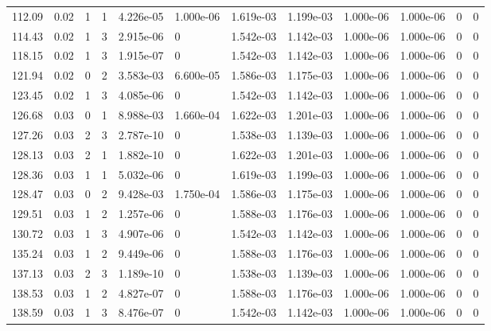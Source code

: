 \documentclass[preview]{standalone}
\begin{document}
{{{\begin{tabular}{L{1.2cm}C{1.2cm} C{0.3cm}C{0.5cm} C{1.4cm}C{1.4cm} C{1.4cm}C{1.4cm} C{1.6cm}C{1.6cm} C{1.6cm}C{1.6cm}}
  112.09  &  0.02  & 1     &  1 &  4.226e-05  & 1.000e-06  &  1.619e-03&   1.199e-03& 1.000e-06 & 1.000e-06   &  0 & 0  \\ 
  114.43  &  0.02  & 1     &  3 &  2.915e-06  & 0  &  1.542e-03&   1.142e-03& 1.000e-06 & 1.000e-06   &  0 & 0  \\ 
  118.15  &  0.02  & 1     &  3 &  1.915e-07  & 0  &  1.542e-03&   1.142e-03& 1.000e-06 & 1.000e-06   &  0 & 0  \\ 
  121.94  &  0.02  & 0     &  2 &  3.583e-03  & 6.600e-05  &  1.586e-03&   1.175e-03& 1.000e-06 & 1.000e-06   &  0 & 0  \\ 
  123.45  &  0.02  & 1     &  3 &  4.085e-06  & 0  &  1.542e-03&   1.142e-03& 1.000e-06 & 1.000e-06   &  0 & 0  \\ 
  126.68  &  0.03  & 0     &  1 &  8.988e-03  & 1.660e-04  &  1.622e-03&   1.201e-03& 1.000e-06 & 1.000e-06   &  0 & 0  \\ 
  127.26  &  0.03  & 2     &  3 &  2.787e-10  & 0  &  1.538e-03&   1.139e-03& 1.000e-06 & 1.000e-06   &  0 & 0  \\ 
  128.13  &  0.03  & 2     &  1 &  1.882e-10  & 0  &  1.622e-03&   1.201e-03& 1.000e-06 & 1.000e-06   &  0 & 0  \\ 
  128.36  &  0.03  & 1     &  1 &  5.032e-06  & 0  &  1.619e-03&   1.199e-03& 1.000e-06 & 1.000e-06   &  0 & 0  \\ 
  128.47  &  0.03  & 0     &  2 &  9.428e-03  & 1.750e-04  &  1.586e-03&   1.175e-03& 1.000e-06 & 1.000e-06   &  0 & 0  \\ 
  129.51  &  0.03  & 1     &  2 &  1.257e-06  & 0  &  1.588e-03&   1.176e-03& 1.000e-06 & 1.000e-06   &  0 & 0  \\ 
  130.72  &  0.03  & 1     &  3 &  4.907e-06  & 0  &  1.542e-03&   1.142e-03& 1.000e-06 & 1.000e-06   &  0 & 0  \\ 
  135.24  &  0.03  & 1     &  2 &  9.449e-06  & 0  &  1.588e-03&   1.176e-03& 1.000e-06 & 1.000e-06   &  0 & 0  \\ 
  137.13  &  0.03  & 2     &  3 &  1.189e-10  & 0  &  1.538e-03&   1.139e-03& 1.000e-06 & 1.000e-06   &  0 & 0  \\ 
  138.53  &  0.03  & 1     &  2 &  4.827e-07  & 0  &  1.588e-03&   1.176e-03& 1.000e-06 & 1.000e-06   &  0 & 0  \\ 
  138.59  &  0.03  & 1     &  3 &  8.476e-07  & 0  &  1.542e-03&   1.142e-03& 1.000e-06 & 1.000e-06   &  0 & 0  \\ 
\hline 
\end{tabular} 

}}}
\end{document}
